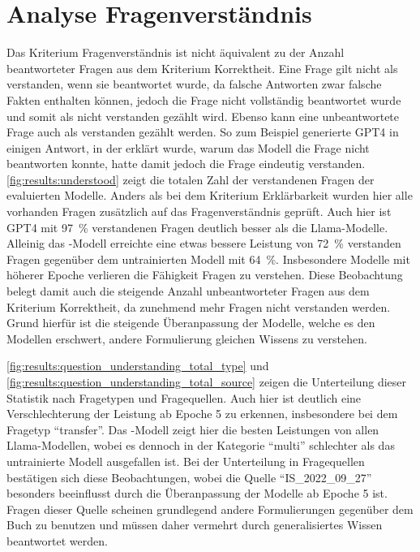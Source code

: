 \section{Analyse Fragenverständnis}\label{sec:results:questionunderstanding}
Das Kriterium Fragenverständnis ist nicht äquivalent zu der Anzahl beantworteter Fragen aus dem Kriterium Korrektheit.
Eine Frage gilt nicht als verstanden, wenn sie beantwortet wurde, da falsche Antworten zwar falsche Fakten enthalten können, jedoch die Frage nicht vollständig beantwortet wurde und somit als nicht verstanden gezählt wird.
Ebenso kann eine unbeantwortete Frage auch als verstanden gezählt werden.
So zum Beispiel generierte GPT4 in einigen Antwort, in der erklärt wurde, warum das Modell die Frage nicht beantworten konnte, hatte damit jedoch die Frage eindeutig verstanden.\\

\cref{fig:results:understood} zeigt die totalen Zahl der verstandenen Fragen der evaluierten Modelle.
Anders als bei dem Kriterium Erklärbarkeit wurden hier alle vorhanden Fragen zusätzlich auf das Fragenverständnis geprüft.
Auch hier ist GPT4 mit \SI{97}{\percent} verstandenen Fragen deutlich besser als die Llama-Modelle.
Alleinig das \lea-Modell erreichte eine etwas bessere Leistung von \SI{72}{\percent} verstanden Fragen gegenüber dem untrainierten Modell mit \SI{64}{\percent}.
Insbesondere Modelle mit höherer Epoche verlieren die Fähigkeit Fragen zu verstehen.
Diese Beobachtung belegt damit auch die steigende Anzahl unbeantworteter Fragen aus dem Kriterium Korrektheit, da zunehmend mehr Fragen nicht verstanden werden.
Grund hierfür ist die steigende Überanpassung der Modelle, welche es den Modellen erschwert, andere Formulierung gleichen Wissens zu verstehen.\\


\cref{fig:results:question_understanding_total_type} und \cref{fig:results:question_understanding_total_source} zeigen die Unterteilung dieser Statistik nach Fragetypen und Fragequellen.
Auch hier ist deutlich eine Verschlechterung der Leistung ab Epoche 5 zu erkennen, insbesondere bei dem Fragetyp \enquote{transfer}. Das \lea-Modell zeigt hier die besten Leistungen von allen Llama-Modellen, wobei es dennoch in der Kategorie \enquote{multi} schlechter als das untrainierte Modell ausgefallen ist.
Bei der Unterteilung in Fragequellen bestätigen sich diese Beobachtungen, wobei die Quelle \enquote{IS\_2022\_09\_27} besonders beeinflusst durch die Überanpassung der Modelle ab Epoche 5 ist.
Fragen dieser Quelle scheinen grundlegend andere Formulierungen gegenüber dem Buch zu benutzen und müssen daher vermehrt durch generalisiertes Wissen beantwortet werden.

